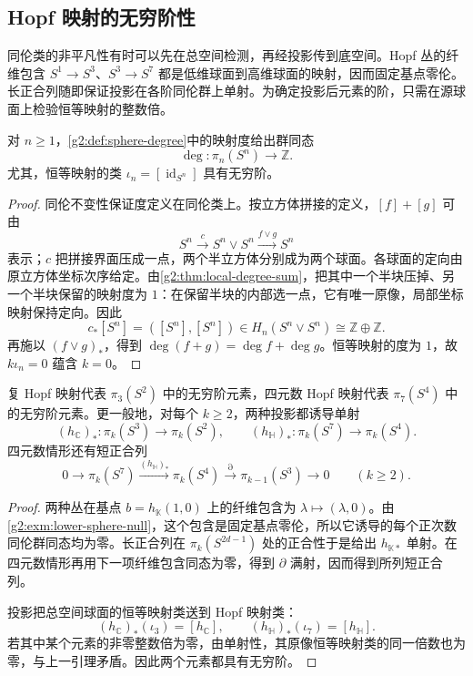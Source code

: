 \subsection{Hopf 映射的无穷阶性}
\label{g2:subsec:0804:04}

同伦类的非平凡性有时可以先在总空间检测，再经投影传到底空间。Hopf 丛的纤维包含 \(S^1\rightarrow S^3\)、\(S^3\rightarrow S^7\) 都是低维球面到高维球面的映射，因而固定基点零伦。长正合列随即保证投影在各阶同伦群上单射。为确定投影后元素的阶，只需在源球面上检验恒等映射的整数倍。

\begin{lemma}\label{g2:lem:degree-homotopy-additivity}
	对 \(n\ge1\)，\cref{g2:def:sphere-degree}中的映射度给出群同态
	\[
		\deg:\pi_n(S^n)\longrightarrow\mathbb Z.
	\]
	尤其，恒等映射的类 \(\iota_n=[\operatorname{id}_{S^n}]\) 具有无穷阶。
\end{lemma}
\begin{proof}
	同伦不变性保证度定义在同伦类上。按立方体拼接的定义，\([f]+[g]\) 可由
	\[
		S^n\xrightarrow{c}S^n\vee S^n\xrightarrow{f\vee g}S^n
	\]
	表示；\(c\) 把拼接界面压成一点，两个半立方体分别成为两个球面。各球面的定向由原立方体坐标次序给定。由\cref{g2:thm:local-degree-sum}，把其中一个半块压掉、另一个半块保留的映射度为 \(1\)：在保留半块的内部选一点，它有唯一原像，局部坐标映射保持定向。因此
	\[
		c_*[S^n]=([S^n],[S^n])\in H_n(S^n\vee S^n)\cong\mathbb Z\oplus\mathbb Z.
	\]
	再施以 \((f\vee g)_*\)，得到 \(\deg(f+g)=\deg f+\deg g\)。恒等映射的度为 \(1\)，故 \(k\iota_n=0\) 蕴含 \(k=0\)。
\end{proof}

\begin{theorem}\label{g2:thm:hopf-infinite-order}
	复 Hopf 映射代表 \(\pi_3(S^2)\) 中的无穷阶元素，四元数 Hopf 映射代表 \(\pi_7(S^4)\) 中的无穷阶元素。更一般地，对每个 \(k\ge2\)，两种投影都诱导单射
	\[
		(h_{\mathbb C})_*:\pi_k(S^3)\longrightarrow\pi_k(S^2),\qquad
		(h_{\mathbb H})_*:\pi_k(S^7)\longrightarrow\pi_k(S^4).
	\]
	四元数情形还有短正合列
	\[
		0\longrightarrow\pi_k(S^7)\xrightarrow{(h_{\mathbb H})_*}\pi_k(S^4)
		\xrightarrow{\partial}\pi_{k-1}(S^3)\longrightarrow0\qquad(k\ge2).
	\]
\end{theorem}
\begin{proof}
	两种丛在基点 \(b=h_{\mathbb K}(1,0)\) 上的纤维包含为 \(\lambda\mapsto(\lambda,0)\)。由\cref{g2:exm:lower-sphere-null}，这个包含是固定基点零伦，所以它诱导的每个正次数同伦群同态均为零。长正合列在 \(\pi_k(S^{2d-1})\) 处的正合性于是给出 \(h_{\mathbb K*}\) 单射。在四元数情形再用下一项纤维包含同态为零，得到 \(\partial\) 满射，因而得到所列短正合列。

	投影把总空间球面的恒等映射类送到 Hopf 映射类：
	\[
		(h_{\mathbb C})_*(\iota_3)=[h_{\mathbb C}],\qquad
		(h_{\mathbb H})_*(\iota_7)=[h_{\mathbb H}].
	\]
	若其中某个元素的非零整数倍为零，由单射性，其原像恒等映射类的同一倍数也为零，与上一引理矛盾。因此两个元素都具有无穷阶。
\end{proof}

